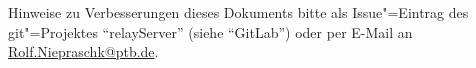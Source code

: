 \documentclass[titlepage=false,toc=nobibliography]{vl-report}
\newcommand*\theServer{relayServer}
\begin{document}
\mbox{}\vfill\par\bigskip
\begingroup \small \itshape

\noindent Hinweise zu Verbesserungen dieses Dokuments bitte als
Issue"=Eintrag des git"=Projektes "`\theServer"' (siehe "`GitLab"') oder per
E-Mail an \url{Rolf.Niepraschk@ptb.de}.

\endgroup
\end{document}
